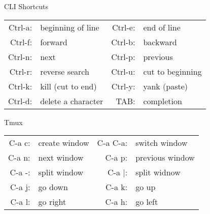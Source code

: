 \begin{frame}{CLI Shortcuts}
  \begin{center}
    \begin{tabular}{>{\ttfamily}r@{\quad}l|>{\ttfamily}r@{\quad}l}
      Ctrl-a: & beginning of line  & Ctrl-e:  & end of line      \\
      Ctrl-f: & forward            & Ctrl-b:  & backward         \\
      Ctrl-n: & next               & Ctrl-p:  & previous         \\
      Ctrl-r: & reverse search     & Ctrl-u:  & cut to beginning \\
      Ctrl-k: & kill (cut to end)  & Ctrl-y:  & yank (paste)     \\
      Ctrl-d: & delete a character & TAB:     & completion       \\
    \end{tabular}
  \end{center}
  \begin{block}{Tmux}
    \begin{tabular}{>{\ttfamily}r@{\quad}l|>{\ttfamily}r@{\quad}l}
      C-a c:  & create window      & C-a C-a: & switch window    \\
      C-a n:  & next window        & C-a p:   & previous window  \\
      C-a -:  & split window       & C-a |:   & split widnow     \\
      C-a j:  & go down            & C-a k:   & go up            \\
      C-a l:  & go right           & C-a h:   & go left          \\
    \end{tabular}
  \end{block}
\end{frame}

